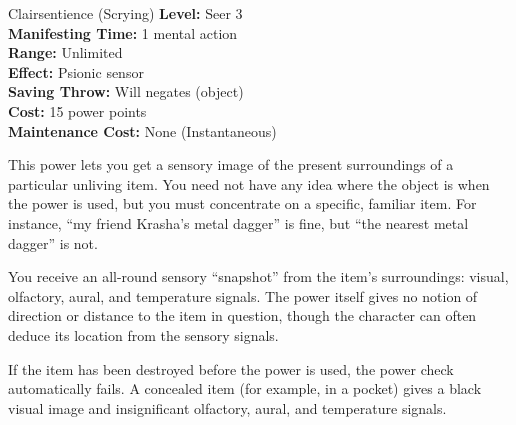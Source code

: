 {Clairsentience (Scrying)}
{
	\textbf{Level:}
	Seer 3\\
	\textbf{Manifesting Time:}
	1 mental action\\
	\textbf{Range:}
	Unlimited\\
	\textbf{Effect:}
	Psionic sensor\\
	\textbf{Saving Throw:}
	Will negates (object)\\
	\textbf{Cost:}
	15 power points\\
	\textbf{Maintenance Cost:}
	None (Instantaneous)\\
}
{
	This power lets you get a sensory image of the present surroundings of a particular unliving item. You need not have any idea where the object is when the power is used, but you must concentrate on a specific, familiar item. For instance, ``my friend Krasha's metal dagger'' is fine, but ``the nearest metal dagger'' is not.

	You receive an all-round sensory ``snapshot'' from the item's surroundings: visual, olfactory, aural, and temperature signals. The power itself gives no notion of direction or distance to the item in question, though the character can often deduce its location from the sensory signals.

	If the item has been destroyed before the power is used, the power check automatically fails. A concealed item (for example, in a pocket) gives a black visual image and insignificant olfactory, aural, and temperature signals.
}